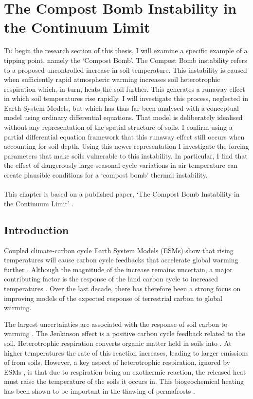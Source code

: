 \chapter{The Compost Bomb Instability in the Continuum Limit}
\label{chapter:continuous_compost_bomb}
\graphicspath{{continuous_compost_bomb/figs/}}

\lettrine[lines=3,loversize=0.1,findent=0.1em,nindent=0em]{T}{o} begin the research section of this thesis, I will examine a specific example of a tipping point, namely the `Compost Bomb'. The
Compost Bomb instability refers to a proposed uncontrolled increase in soil temperature. This instability is caused when sufficiently rapid
atmospheric warming increases soil heterotrophic respiration which, in turn, heats the soil further. This generates a runaway
effect in which soil temperatures rise rapidly. I will investigate this process, neglected in Earth System Models, but which has thus far been analysed with a conceptual
model using ordinary differential equations. That model is deliberately idealised without any representation of the spatial structure of soils.
I confirm using a partial differential equation framework that this runaway effect still occurs when accounting for soil depth.
Using this newer representation I investigate the forcing parameters that make soils vulnerable to this instability. In particular, I find that the effect of
dangerously large seasonal cycle variations in air temperature can create plausible conditions for a `compost bomb' thermal instability.
\\\\
This chapter is based on a published paper, `The Compost Bomb Instability in the Continuum Limit' \parencite{Clarke2021}.

 \section{Introduction}
\label{section:compost_bomb_intro}
Coupled climate-carbon cycle Earth System Models (ESMs) show that rising temperatures will cause carbon cycle feedbacks that accelerate global
warming further \parencite{Cox2000}. Although the magnitude of the increase remains uncertain, a major contributing factor is the
response of the land carbon cycle to increased temperatures \parencite{Friedlingstein2006,Arora2020}. Over the last decade, there has therefore been a strong focus on improving
models of the expected response of terrestrial carbon to global warming.

The largest uncertainties are associated with the response of soil carbon to warming \parencite{Varney2020}.
The Jenkinson effect \parencite{Jenkinson1991} is a positive carbon cycle feedback related to the soil. Heterotrophic respiration converts
organic matter held in soils into . At higher temperatures the rate of this reaction increases, leading to
larger emissions of  from soils. However, a key aspect of heterotrophic respiration, ignored by ESMs \parencite{Arora2020}, is that due to respiration being
an exothermic reaction, the released heat must raise the temperature of the soils it occurs in. This biogeochemical heating has been shown
to be important in the thawing of permafrosts \parencite{Khvorostyanov2008,Khvorostyanov2008a}.

